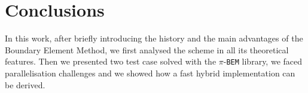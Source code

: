 
\section{Conclusions}
\label{sec:Conclusions}

In this work, after briefly introducing the history and the main advantages of the Boundary Element Method, we first analysed the scheme in all its theoretical features. Then we presented two test case solved with the $\pi$-\texttt{BEM} library, we faced parallelisation challenges and we showed how a fast hybrid implementation can be derived.
